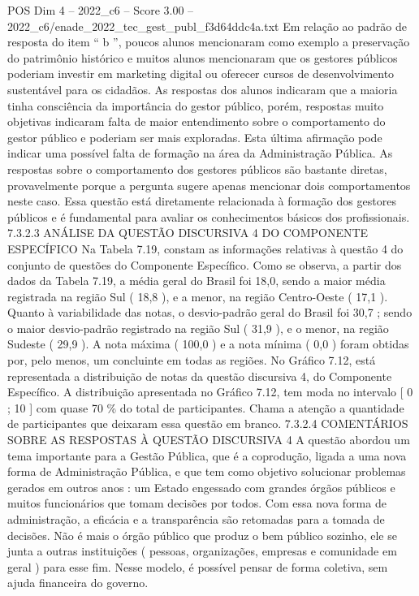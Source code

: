 \begin{textsample}{POS Dim 4 – 2022\_c6 – Score 3.00 – 2022\_c6/enade\_2022\_tec\_gest\_publ\_f3d64ddc4a.txt}
Em relação ao padrão de resposta do item “ b ”, poucos alunos mencionaram como exemplo a preservação do patrimônio histórico e muitos alunos mencionaram que os gestores públicos poderiam investir em marketing digital ou oferecer cursos de desenvolvimento sustentável para os cidadãos.
As respostas dos alunos indicaram que a maioria tinha consciência da importância do gestor público, porém, respostas muito objetivas indicaram falta de maior entendimento sobre o comportamento do gestor público e poderiam ser mais exploradas.
Esta última afirmação pode indicar uma possível falta de formação na área da Administração Pública.
As respostas sobre o comportamento dos gestores públicos são bastante diretas, provavelmente porque a pergunta sugere apenas mencionar dois comportamentos neste caso.
Essa questão está diretamente relacionada à formação dos gestores públicos e é fundamental para avaliar os conhecimentos básicos dos profissionais. 7.3.2.3 ANÁLISE DA QUESTÃO DISCURSIVA 4 DO COMPONENTE ESPECÍFICO Na Tabela 7.19, constam as informações relativas à questão 4 do conjunto de questões do Componente Específico.
Como se observa, a partir dos dados da Tabela 7.19, a média geral do Brasil foi 18,0, sendo a maior média registrada na região Sul ( 18,8 ), e a menor, na região Centro-Oeste ( 17,1 ).
Quanto à variabilidade das notas, o desvio-padrão geral do Brasil foi 30,7 ; sendo o maior desvio-padrão registrado na região Sul ( 31,9 ), e o menor, na região Sudeste ( 29,9 ).
A nota máxima ( 100,0 ) e a nota mínima ( 0,0 ) foram obtidas por, pelo menos, um concluinte em todas as regiões.
No Gráfico 7.12, está representada a distribuição de notas da questão discursiva 4, do Componente Específico.
A distribuição apresentada no Gráfico 7.12, tem moda no intervalo [ 0 ; 10 ] com quase 70 \% do total de participantes.
Chama a atenção a quantidade de participantes que deixaram essa questão em branco. 7.3.2.4 COMENTÁRIOS SOBRE AS RESPOSTAS À QUESTÃO DISCURSIVA 4 A questão abordou um tema importante para a Gestão Pública, que é a coprodução, ligada a uma nova forma de Administração Pública, e que tem como objetivo solucionar problemas gerados em outros anos : um Estado engessado com grandes órgãos públicos e muitos funcionários que tomam decisões por todos.
Com essa nova forma de administração, a eficácia e a transparência são retomadas para a tomada de decisões.
Não é mais o órgão público que produz o bem público sozinho, ele se junta a outras instituições ( pessoas, organizações, empresas e comunidade em geral ) para esse fim.
Nesse modelo, é possível pensar de forma coletiva, sem ajuda financeira do governo.

\end{textsample}
